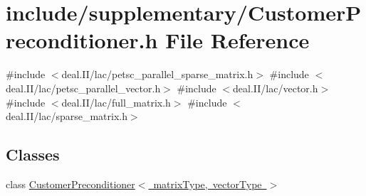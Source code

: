 \section{include/supplementary/\+Customer\+Preconditioner.h File Reference}
\label{_customer_preconditioner_8h}
{\ttfamily \#include $<$deal.\+I\+I/lac/petsc\+\_\+parallel\+\_\+sparse\+\_\+matrix.\+h$>$}\newline
{\ttfamily \#include $<$deal.\+I\+I/lac/petsc\+\_\+parallel\+\_\+vector.\+h$>$}\newline
{\ttfamily \#include $<$deal.\+I\+I/lac/vector.\+h$>$}\newline
{\ttfamily \#include $<$deal.\+I\+I/lac/full\+\_\+matrix.\+h$>$}\newline
{\ttfamily \#include $<$deal.\+I\+I/lac/sparse\+\_\+matrix.\+h$>$}\newline
\subsection*{Classes}
\begin{DoxyCompactItemize}
\item 
class \mbox{\hyperlink{class_customer_preconditioner}{Customer\+Preconditioner$<$ matrix\+Type, vector\+Type $>$}}
\end{DoxyCompactItemize}
